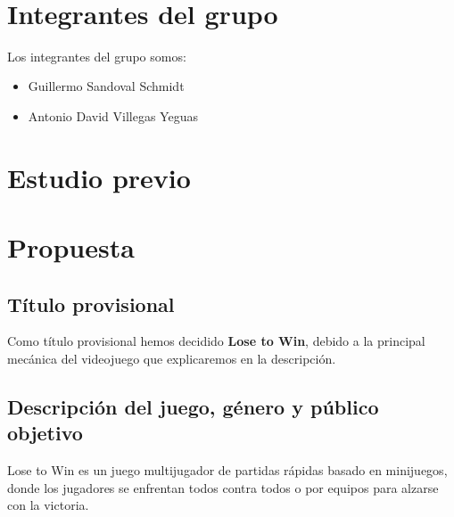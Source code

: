 \documentclass[12pt, spanish]{article}
\makeatletter
\let\thedate\@date
\makeatother
\begin{document}
\begin{titlepage}
    {\large \thedate}\\[0.5cm]
    {\doclicenseThis}

    \vfill

\end{titlepage}


\tableofcontents
\pagebreak


\section{Integrantes del grupo}

Los integrantes del grupo somos:

\begin{itemize}
	\item Guillermo Sandoval Schmidt
	\item Antonio David Villegas Yeguas
\end{itemize}

\section*{Estudio previo}
\label{sec:estudio_previo}

\section{Propuesta}

\subsection{Título provisional}

Como título provisional hemos decidido \textbf{Lose to Win}, debido a la principal mecánica del videojuego que explicaremos en la descripción.

\subsection{Descripción del juego, género y público objetivo}


Lose to Win es un juego multijugador de partidas rápidas basado en minijuegos, donde los jugadores se enfrentan todos contra todos o por equipos para alzarse con la victoria.
\end{document}

